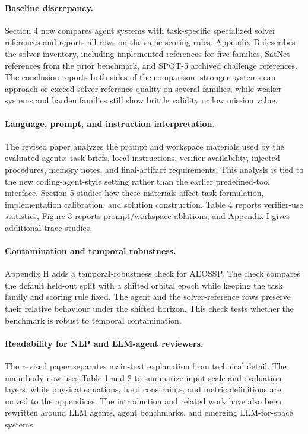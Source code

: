 \documentclass[11pt]{article}
\begin{document}
\paragraph{Baseline discrepancy.}
Section 4 now compares agent systems with task-specific specialized solver references and reports all rows on the same scoring rules. Appendix D describes the solver inventory, including implemented references for five families, SatNet references from the prior benchmark, and SPOT-5 archived challenge references. The conclusion reports both sides of the comparison: stronger systems can approach or exceed solver-reference quality on several families, while weaker systems and harden families still show brittle validity or low mission value.

\paragraph{Language, prompt, and instruction interpretation.}
The revised paper analyzes the prompt and workspace materials used by the evaluated agents: task briefs, local instructions, verifier availability, injected procedures, memory notes, and final-artifact requirements. This analysis is tied to the new coding-agent-style setting rather than the earlier predefined-tool interface. Section 5 studies how these materials affect task formulation, implementation calibration, and solution construction. Table 4 reports verifier-use statistics, Figure 3 reports prompt/workspace ablations, and Appendix I gives additional trace studies.

\paragraph{Contamination and temporal robustness.}
Appendix H adds a temporal-robustness check for AEOSSP. The check compares the default held-out split with a shifted orbital epoch while keeping the task family and scoring rule fixed. The agent and the solver-reference rows preserve their relative behaviour under the shifted horizon. This check tests whether the benchmark is robust to temporal contamination.

\paragraph{Readability for NLP and LLM-agent reviewers.}
The revised paper separates main-text explanation from technical detail. The main body now uses Table 1 and 2 to summarize input scale and evaluation layers, while physical equations, hard constraints, and metric definitions are moved to the appendices. The introduction and related work have also been rewritten around LLM agents, agent benchmarks, and emerging LLM-for-space systems.
\end{document}
